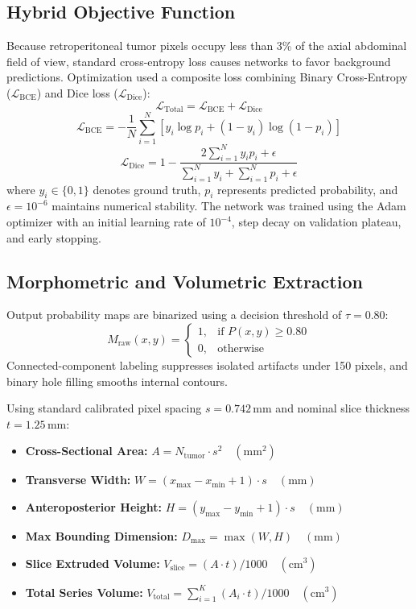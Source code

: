 \documentclass[conference]{IEEEtran}
\begin{document}
\subsection{Hybrid Objective Function}
Because retroperitoneal tumor pixels occupy less than 3\% of the axial abdominal field of view, standard cross-entropy loss causes networks to favor background predictions. Optimization used a composite loss combining Binary Cross-Entropy ($\mathcal{L}_{\text{BCE}}$) and Dice loss ($\mathcal{L}_{\text{Dice}}$):
\begin{equation}
    \mathcal{L}_{\text{Total}} = \mathcal{L}_{\text{BCE}} + \mathcal{L}_{\text{Dice}}
\end{equation}
\begin{equation}
    \mathcal{L}_{\text{BCE}} = -\frac{1}{N}\sum_{i=1}^N \left[ y_i \log p_i + (1-y_i)\log(1-p_i) \right]
\end{equation}
\begin{equation}
    \mathcal{L}_{\text{Dice}} = 1 - \frac{2\sum_{i=1}^N y_i p_i + \epsilon}{\sum_{i=1}^N y_i + \sum_{i=1}^N p_i + \epsilon}
\end{equation}
where $y_i \in \{0, 1\}$ denotes ground truth, $p_i$ represents predicted probability, and $\epsilon = 10^{-6}$ maintains numerical stability. The network was trained using the Adam optimizer with an initial learning rate of $10^{-4}$, step decay on validation plateau, and early stopping.

\subsection{Morphometric and Volumetric Extraction}
Output probability maps are binarized using a decision threshold of $\tau = 0.80$:
\begin{equation}
    M_{\text{raw}}(x,y) = \begin{cases} 1, & \text{if } P(x,y) \ge 0.80 \\ 0, & \text{otherwise} \end{cases}
\end{equation}
Connected-component labeling suppresses isolated artifacts under 150 pixels, and binary hole filling smooths internal contours.

Using standard calibrated pixel spacing $s = 0.742$\,mm and nominal slice thickness $t = 1.25$\,mm:
\begin{itemize}
    \item \textbf{Cross-Sectional Area:} $A = N_{\text{tumor}} \cdot s^2 \quad (\text{mm}^2)$
    \item \textbf{Transverse Width:} $W = (x_{\max} - x_{\min} + 1) \cdot s \quad (\text{mm})$
    \item \textbf{Anteroposterior Height:} $H = (y_{\max} - y_{\min} + 1) \cdot s \quad (\text{mm})$
    \item \textbf{Max Bounding Dimension:} $D_{\max} = \max(W, H) \quad (\text{mm})$
    \item \textbf{Slice Extruded Volume:} $V_{\text{slice}} = (A \cdot t) / 1000 \quad (\text{cm}^3)$
    \item \textbf{Total Series Volume:} $V_{\text{total}} = \sum_{i=1}^K (A_i \cdot t) / 1000 \quad (\text{cm}^3)$
\end{itemize}
\end{document}
